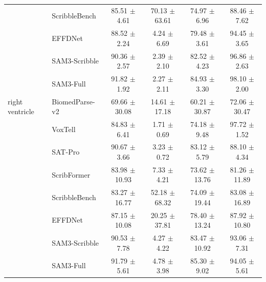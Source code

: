 \documentclass[preprint,12pt]{elsarticle}
\begin{document}
\begin{table}[!p]
{\begin{tabular}{l l c c c c}
 & ScribbleBench & 85.51 $\pm$ 4.61 & 70.13 $\pm$ 63.61 & 74.97 $\pm$ 6.96 & 88.46 $\pm$ 7.62 \\
 & EFFDNet & 88.52 $\pm$ 2.24 & 4.24 $\pm$ 6.69 & 79.48 $\pm$ 3.61 & 94.45 $\pm$ 3.65 \\
 & SAM3-Scribble & 90.36 $\pm$ 2.57 & 2.39 $\pm$ 2.10 & 82.52 $\pm$ 4.23 & 96.86 $\pm$ 2.63 \\
 & SAM3-Full & 91.82 $\pm$ 1.92 & 2.27 $\pm$ 2.11 & 84.93 $\pm$ 3.30 & 98.10 $\pm$ 2.00 \\
right ventricle & BiomedParse-v2 & \cellcolor{gray!20}69.66 $\pm$ 30.08 & \cellcolor{gray!20}14.61 $\pm$ 17.18 & \cellcolor{gray!20}60.21 $\pm$ 30.87 & \cellcolor{gray!20}72.06 $\pm$ 30.47 \\
 & VoxTell & \cellcolor{gray!20}84.83 $\pm$ 6.41 & \cellcolor{gray!20}1.71 $\pm$ 0.69 & \cellcolor{gray!20}74.18 $\pm$ 9.48 & \cellcolor{gray!20}97.72 $\pm$ 1.52 \\
 & SAT-Pro & \cellcolor{gray!20}90.67 $\pm$ 3.66 & \cellcolor{gray!20}3.23 $\pm$ 0.72 & \cellcolor{gray!20}83.12 $\pm$ 5.79 & \cellcolor{gray!20}88.10 $\pm$ 4.34 \\
 & ScribFormer & 83.98 $\pm$ 10.93 & 7.33 $\pm$ 4.21 & 73.62 $\pm$ 13.76 & 81.26 $\pm$ 11.89 \\
 & ScribbleBench & 83.27 $\pm$ 16.77 & 52.18 $\pm$ 68.32 & 74.09 $\pm$ 19.44 & 83.08 $\pm$ 16.89 \\
 & EFFDNet & 87.15 $\pm$ 10.08 & 20.25 $\pm$ 37.81 & 78.40 $\pm$ 13.24 & 87.92 $\pm$ 10.80 \\
 & SAM3-Scribble & 90.53 $\pm$ 7.78 & 4.27 $\pm$ 4.22 & 83.47 $\pm$ 10.92 & 93.06 $\pm$ 7.31 \\
 & SAM3-Full & 91.79 $\pm$ 5.61 & 4.78 $\pm$ 3.98 & 85.30 $\pm$ 9.02 & 94.05 $\pm$ 5.61 \\
\bottomrule
\end{tabular}%
}
\end{table}
\end{document}
